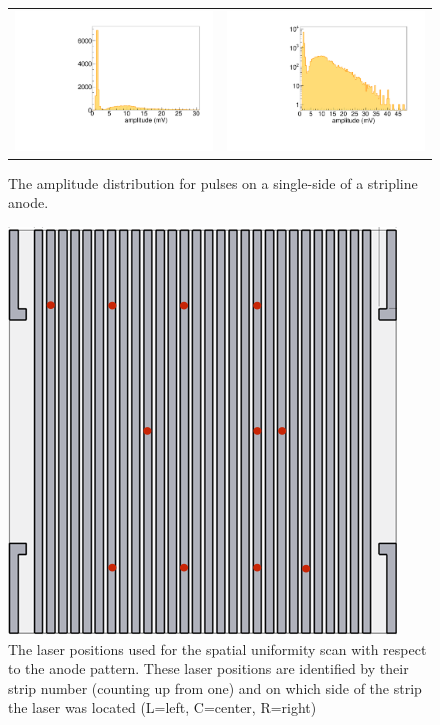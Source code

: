 \documentclass[preprint,12pt]{elsarticle}
\begin{document}
\begin{figure}
	\centering
        \begin{tabular}{l l}
                \includegraphics[width=0.52\linewidth]{plots/Amplitudes_notlog} &
                \includegraphics[width=0.53\linewidth]{plots/Amplitudes}\\
         \end{tabular}  
       \caption{The amplitude distribution for pulses on a single-side of a stripline anode.}
	\label{fig:amp}
\end{figure}

\begin{figure}
	\centering
       \includegraphics[angle=90, width=0.45\linewidth]{plots/positions}  
       \caption{The laser positions used for the spatial uniformity scan with respect to the anode pattern. These laser positions are identified by their strip number (counting up from one) and on which side of the strip the laser was located (L=left, C=center, R=right)}
	\label{fig:positions}
\end{figure}
\end{document}

